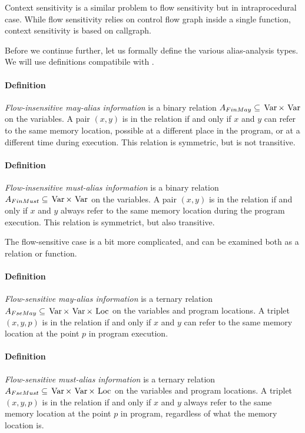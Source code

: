 Context sensitivity is a similar problem to flow sensitivity but in
intraprocedural case. While flow sensitivity relies on control flow graph inside
a single function, context sensitivity is based on callgraph. 

Before we continue further, let us formally define the various alias-analysis
types. We will use definitions compatibile with  \cite{muchnick1997advanced}.

\paragraph{Definition} {\it Flow-insensitive may-alias information} is a binary
relation $A_{FinMay} \subseteq \operatorname*{\,Var} \times \operatorname*{\,Var} $ on the variables. A pair
$(x,y)$ is in the relation if and only if $x$ and $y$ can refer to the same
memory location, possible at a different place in the program, or at a different
time during execution. This relation is symmetric, but is not transitive.

\paragraph{Definition} {\it Flow-insensitive must-alias information} is a binary
relation $A_{FinMust} \subseteq \operatorname*{\,Var} \times \operatorname*{\,Var}$ on the variables. A pair
$(x,y)$ is in the relation if and only if $x$ and $y$ always refer to the same
memory location during the program execution. This relation is symmetrict, but
also transitive. 

The flow-sensitive case is a bit more complicated, and can be examined both as a
relation or function.

\paragraph{Definition} {\it Flow-sensitive may-alias information} is a ternary
relation $A_{FseMay} \subseteq \operatorname*{\,Var} \times \operatorname*{\,Var} \times \operatorname*{\,Loc}$ on the variables
and program locations. A triplet $(x,y,p)$ is in the relation if and only if $x$
and $y$ can refer to the same memory location at the point $p$ in program
execution.

\paragraph{Definition} {\it Flow-sensitive must-alias information} is a ternary
relation $A_{FseMust} \subseteq \operatorname*{\,Var} \times \operatorname*{\,Var} \times \operatorname*{\,Loc}$ on the variables
and program locations. A triplet $(x,y,p)$ is in the relation if and only if $x$
and $y$ always refer to the same memory location at the point $p$ in program,
regardless of what the memory location is.

